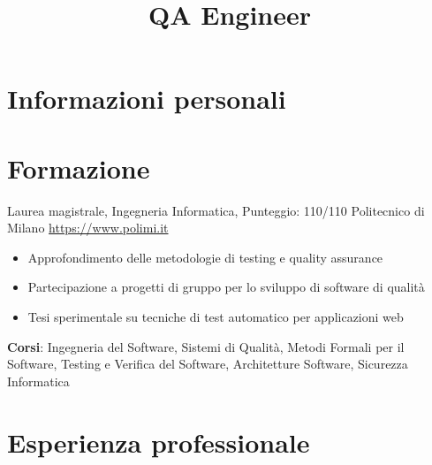\documentclass[a4paper, serif, 10pt]{moderncv}
\title{QA Engineer}
\begin{document}
\maketitle

\section{Informazioni personali}

\section{Formazione}

        {Laurea magistrale, Ingegneria Informatica, Punteggio: 110/110}
        {Politecnico di Milano}
        {\url{https://www.polimi.it}}
        {}
        {\begin{itemize}
\item Approfondimento delle metodologie di testing e quality assurance
\item Partecipazione a progetti di gruppo per lo sviluppo di software di qualità
\item Tesi sperimentale su tecniche di test automatico per applicazioni web
\end{itemize}
\textbf{Corsi}: Ingegneria del Software, Sistemi di Qualità, Metodi Formali per il Software, Testing e Verifica del Software, Architetture Software, Sicurezza Informatica}
\section{Esperienza professionale}
\end{document}
